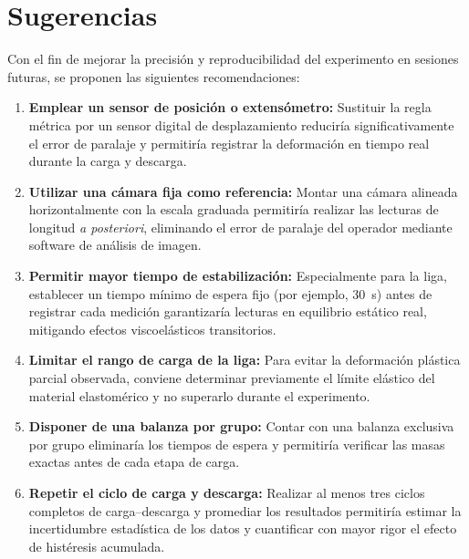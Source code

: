 
\section{Sugerencias}

Con el fin de mejorar la precisión y reproducibilidad del experimento
en sesiones futuras, se proponen las siguientes recomendaciones:

\begin{enumerate}

    \item \textbf{Emplear un sensor de posición o extensómetro:}
    Sustituir la regla métrica por un sensor digital de desplazamiento
    reduciría significativamente el error de paralaje y permitiría
    registrar la deformación en tiempo real durante la carga y descarga.

    \item \textbf{Utilizar una cámara fija como referencia:}
    Montar una cámara alineada horizontalmente con la escala graduada
    permitiría realizar las lecturas de longitud \textit{a posteriori}, eliminando
    el error de paralaje del operador mediante software de análisis de imagen.

    \item \textbf{Permitir mayor tiempo de estabilización:}
    Especialmente para la liga, establecer un tiempo mínimo de espera
    fijo (por ejemplo, \qty{30}{s}) antes de registrar cada medición
    garantizaría lecturas en equilibrio estático real, mitigando efectos viscoelásticos transitorios.

    \item \textbf{Limitar el rango de carga de la liga:}
    Para evitar la deformación plástica parcial observada, conviene
    determinar previamente el límite elástico del material elastomérico y no superarlo
    durante el experimento.

    \item \textbf{Disponer de una balanza por grupo:}
    Contar con una balanza exclusiva por grupo eliminaría los tiempos
    de espera y permitiría verificar las masas exactas antes de cada etapa
    de carga.

    \item \textbf{Repetir el ciclo de carga y descarga:}
    Realizar al menos tres ciclos completos de carga–descarga y promediar
    los resultados permitiría estimar la incertidumbre estadística de
    los datos y cuantificar con mayor rigor el efecto de histéresis acumulada.

\end{enumerate}

